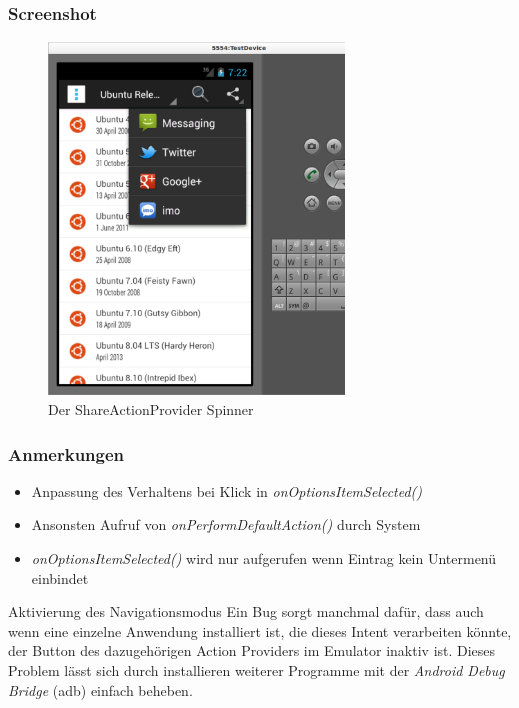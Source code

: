\begin{frame}
   \frametitle{Screenshot}
   \begin{figure}[h!]
     \centering
     \includegraphics[width=0.7\textwidth]{pictures/shareActionProvider.ps}
     \caption{
        Der ShareActionProvider Spinner
     }
     \label{fig:shareActionProvider}
   \end{figure}
\end{frame}

\begin{frame}
   \frametitle{Anmerkungen}
   \begin{itemize}
      \item Anpassung des Verhaltens bei Klick in \emph{onOptionsItemSelected()}
      \item Ansonsten Aufruf von \emph{onPerformDefaultAction()} durch System
      \item \emph{onOptionsItemSelected()} wird nur aufgerufen wenn Eintrag kein 
         Untermenü einbindet
   \end{itemize}

   \begin{alertblock}{Aktivierung des Navigationsmodus}
      Ein Bug sorgt manchmal dafür, dass auch wenn eine einzelne Anwendung 
      installiert ist, die dieses Intent verarbeiten könnte, der Button des dazugehörigen 
      Action Providers im Emulator inaktiv ist. Dieses Problem lässt sich durch installieren 
      weiterer Programme mit der \emph{Android Debug Bridge} (adb) einfach beheben.
   \end{alertblock}
\end{frame}


